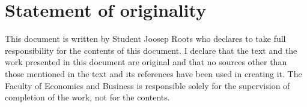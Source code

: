 \chapter{Statement of originality}

This document is written by Student Joosep Roots who
declares to take full responsibility for the contents of this document.
I declare that the text and the work presented in this document are original and that no
sources other than those mentioned in the text and its references have been used in
creating it.
The Faculty of Economics and Business is responsible solely for the supervision of
completion of the work, not for the contents.